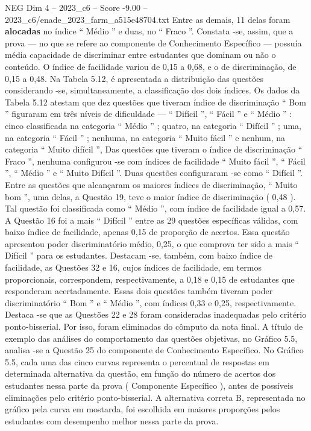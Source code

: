 \begin{textsample}{NEG Dim 4 – 2023\_c6 – Score -9.00 – 2023\_c6/enade\_2023\_farm\_a515e48704.txt}
Entre as demais, 11 delas foram \textbf{alocadas} no índice “ Médio ” e duas, no “ Fraco ”.
Constata -se, assim, que a prova — no que se refere ao componente de Conhecimento Específico — possuía média capacidade de discriminar entre estudantes que dominam ou não o conteúdo.
O índice de facilidade variou de 0,15 a 0,68, e o de discriminação, de 0,15 a 0,48.
Na Tabela 5.12, é apresentada a distribuição das questões considerando -se, simultaneamente, a classificação dos dois índices.
Os dados da Tabela 5.12 atestam que dez questões que tiveram índice de discriminação “ Bom ” figuraram em três níveis de dificuldade — “ Difícil ”, “ Fácil ” e “ Médio ” : cinco classificada na categoria “ Médio ” ; quatro, na categoria “ Difícil ” ; uma, na categoria “ Fácil ” ; nenhuma, na categoria “ Muito fácil ” e nenhum, na categoria “ Muito difícil ”, Das questões que tiveram o índice de discriminação “ Fraco ”, nenhuma configurou -se com índices de facilidade “ Muito fácil ”, “ Fácil ”, “ Médio ” e “ Muito Difícil ”.
Duas questões configuraram -se como “ Difícil ”.
Entre as questões que alcançaram os maiores índices de discriminação, “ Muito bom ”, uma delas, a Questão 19, teve o maior índice de discriminação ( 0,48 ).
Tal questão foi classificada como “ Médio ”, com índice de facilidade igual a 0,57.
A Questão 16 foi a mais “ Difícil ” entre as 29 questões específicas válidas, com baixo índice de facilidade, apenas 0,15 de proporção de acertos.
Essa questão apresentou poder discriminatório médio, 0,25, o que comprova ter sido a mais “ Difícil ” para os estudantes.
Destacam -se, também, com baixo índice de facilidade, as Questões 32 e 16, cujos índices de facilidade, em termos proporcionais, correspondem, respectivamente, a 0,18 e 0,15 de estudantes que responderam acertadamente.
Essas dois questões também tiveram poder discriminatório “ Bom ” e “ Médio ”, com índices 0,33 e 0,25, respectivamente.
Destaca -se que as Questões 22 e 28 foram consideradas inadequadas pelo critério ponto-bisserial.
Por isso, foram eliminadas do cômputo da nota final.
A título de exemplo das análises do comportamento das questões objetivas, no Gráfico 5.5, analisa -se a Questão 25 do componente de Conhecimento Específico.
No Gráfico 5.5, cada uma das cinco curvas representa o percentual de respostas em determinada alternativa da questão, em função do número de acertos dos estudantes nessa parte da prova ( Componente Específico ), antes de possíveis eliminações pelo critério ponto-bisserial.
A alternativa correta B, representada no gráfico pela curva em mostarda, foi escolhida em maiores proporções pelos estudantes com desempenho melhor nessa parte da prova.

\end{textsample}

